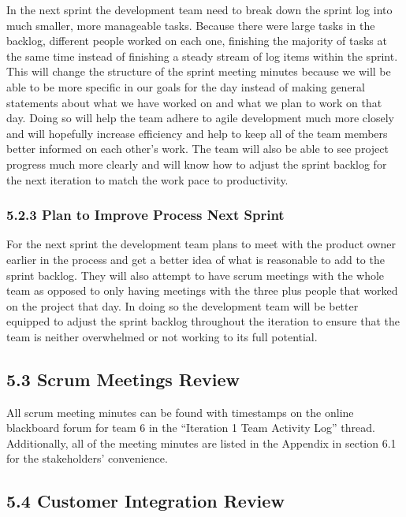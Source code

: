 \documentclass[]{article}
\begin{document}
In the next sprint the development team need to break down the sprint
log into much smaller, more manageable tasks. Because there were large
tasks in the backlog, different people worked on each one, finishing the
majority of tasks at the same time instead of finishing a steady stream
of log items within the sprint. This will change the structure of the
sprint meeting minutes because we will be able to be more specific in
our goals for the day instead of making general statements about what we
have worked on and what we plan to work on that day. Doing so will help
the team adhere to agile development much more closely and will
hopefully increase efficiency and help to keep all of the team members
better informed on each other's work. The team will also be able to see
project progress much more clearly and will know how to adjust the
sprint backlog for the next iteration to match the work pace to
productivity.

\subsubsection{5.2.3 Plan to Improve Process Next
Sprint}\label{plan-to-improve-process-next-sprint}

For the next sprint the development team plans to meet with the product
owner earlier in the process and get a better idea of what is reasonable
to add to the sprint backlog. They will also attempt to have scrum
meetings with the whole team as opposed to only having meetings with the
three plus people that worked on the project that day. In doing so the
development team will be better equipped to adjust the sprint backlog
throughout the iteration to ensure that the team is neither overwhelmed
or not working to its full potential.

\subsection{5.3 Scrum Meetings Review}\label{scrum-meetings-review}

All scrum meeting minutes can be found with timestamps on the online
blackboard forum for team 6 in the ``Iteration 1 Team Activity Log''
thread. Additionally, all of the meeting minutes are listed in the
Appendix in section 6.1 for the stakeholders' convenience.

\subsection{5.4 Customer Integration
Review}\label{customer-integration-review}
\end{document}
